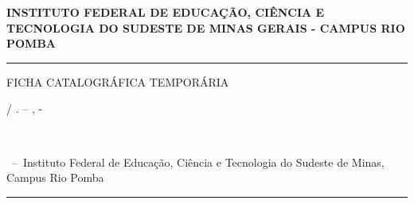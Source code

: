 \documentclass[12pt, openright, oneside, a4paper, english,	french,	spanish, brazil	]{abntex2}
\begin{document}
    \captionsetup{ font= small, labelfont=bf, textfont=small, labelsep=barr, justification=justified, singlelinecheck=false }


    \frenchspacing 

    \begin{center}
        \textbf{ 
            INSTITUTO FEDERAL DE EDUCAÇÃO, CIÊNCIA E TECNOLOGIA DO SUDESTE DE MINAS GERAIS - CAMPUS RIO POMBA
        }
    \end{center}

    \imprimircapa
    \imprimirfolhaderosto*

    \begin{fichacatalografica}
        \vspace*{\fill}					
        \hrule							
        \begin{center}					
            \begin{minipage}[c]{12.5cm}		
            
                FICHA CATALOGRÁFICA TEMPORÁRIA \\
                \imprimirautor
                
                \hspace{0.5cm} \imprimirtitulo  / \imprimirautor. --
                \imprimirlocal, \imprimirdata-

                \hspace{0.5cm} \imprimirorientadorRotulo~\imprimirorientador\\
                
                \hspace{0.5cm}
                \parbox[t]{\textwidth}{%
                    \normalsize
                    \imprimirtipotrabalho~--~Instituto Federal de Educação, Ciência e Tecnologia do Sudeste de Minas, Campus Rio Pomba
                }

            \end{minipage}
        \end{center}
        \hrule
    \end{fichacatalografica}
\end{document}
